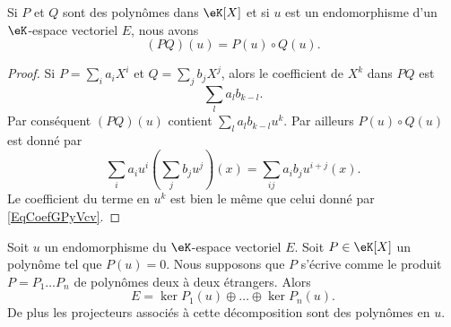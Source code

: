 \begin{lemma}       \label{LemQWvhYb}
    Si \( P\) et \( Q\) sont des polynômes dans \( \eK[X]\) et si \( u\) est un endomorphisme d'un \( \eK\)-espace vectoriel \( E\), nous avons
    \begin{equation}
        (PQ)(u)=P(u)\circ Q(u).
    \end{equation}
\end{lemma}

\begin{proof}
    Si \( P=\sum_i a_iX^i\) et \( Q=\sum_j b_jX^j\), alors le coefficient de \( X^k\) dans \( PQ\) est
    \begin{equation}        \label{EqCoefGPyVcv}
        \sum_la_lb_{k-l}.
    \end{equation}
    Par conséquent \( (PQ)(u)\) contient \( \sum_la_lb_{k-l}u^k\). Par ailleurs \( P(u)\circ Q(u)\) est donné par
    \begin{equation}
        \sum_ia_iu^i\left( \sum_jb_ju^j \right)(x)=\sum_{ij}a_ib_ju^{i+j}(x).
    \end{equation}
    Le coefficient du terme en \( u^k\) est bien le même que celui donné par \eqref{EqCoefGPyVcv}.
\end{proof}

\begin{theorem}       \label{ThoDecompNoyayzzMWod}
    Soit \( u\) un endomorphisme du \( \eK\)-espace vectoriel \( E\). Soit \( P\in\eK[X]\) un polynôme tel que \( P(u)=0\). Nous supposons que \( P\) s'écrive comme le produit \( P=P_1\ldots P_n\) de polynômes deux à deux étrangers. Alors
    \begin{equation}
        E=\ker P_1(u)\oplus\ldots\oplus\ker P_n(u).
    \end{equation}
    De plus les projecteurs associés à cette décomposition sont des polynômes en \( u\).
\end{theorem}

